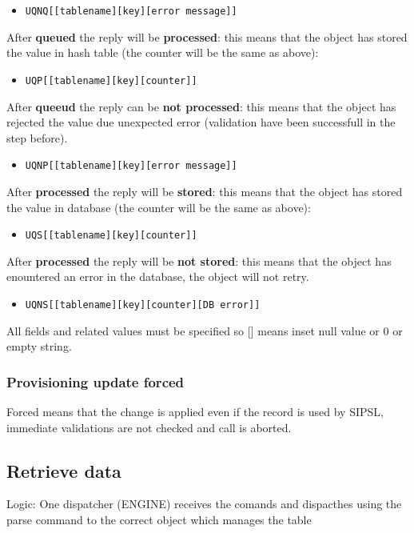 \documentclass[a4paper]{article}
\begin{document}
\begin{itemize}
	\item {\tt UQNQ[[tablename][key][error message]]}
\end{itemize}

After {\bf queued} the reply will be  {\bf processed}: this means that the
object has stored the value in hash table (the counter will be the same as above):

\begin{itemize}
	\item {\tt UQP[[tablename][key][counter]]}
\end{itemize}

After {\bf queeud} the reply can be {\bf not processed}: this means that the
object has rejected the value due unexpected error (validation have been
successfull in the step before).

\begin{itemize}
	\item {\tt UQNP[[tablename][key][error message]]}
\end{itemize}

After {\bf processed} the reply will be {\bf stored}: this means that the
object has stored the value in database (the counter will be the same as above):

\begin{itemize}
	\item {\tt UQS[[tablename][key][counter]]}
\end{itemize}


After {\bf processed} the reply will be {\bf not stored}: this means that the
object has enountered an error in the database, the object will not retry.

\begin{itemize}
	\item {\tt UQNS[[tablename][key][counter][DB error]]}
\end{itemize}

All fields and related values must be specified so [] means inset null value or
0 or empty string.

\subsubsection{Provisioning update forced}

Forced means that the change is applied even if the record is used by
SIPSL, immediate validations are not checked and call is aborted.

\subsection{Retrieve data}
Logic:
One dispatcher (ENGINE) receives the comands and dispacthes using the parse command to the correct object which manages the table
\end{document}
